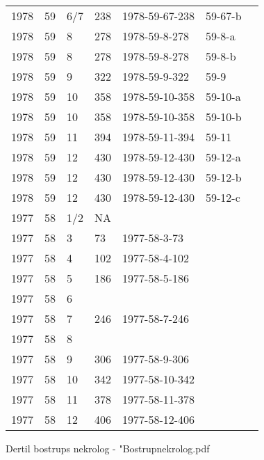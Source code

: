 \begin{longtable}{ |l|l|l|l|p{2.7cm}|l|p{2cm}| }
 1978 & 59 &   6/7 &     238 & 1978-59-67-238 & 59-67-b & \\
 1978 & 59 &     8 &     278 & 1978-59-8-278  & 59-8-a & \\
 1978 & 59 &     8 &     278 & 1978-59-8-278  & 59-8-b & \\
 1978 & 59 &     9 &     322 & 1978-59-9-322  & 59-9  & \\
 1978 & 59 &    10 &     358 & 1978-59-10-358 & 59-10-a & \\
 1978 & 59 &    10 &     358 & 1978-59-10-358 & 59-10-b & \\
 1978 & 59 &    11 &     394 & 1978-59-11-394 & 59-11 & \\
 1978 & 59 &    12 &     430 & 1978-59-12-430 & 59-12-a & \\
 1978 & 59 &    12 &     430 & 1978-59-12-430 & 59-12-b & \\
 1978 & 59 &    12 &     430 & 1978-59-12-430 & 59-12-c & \\
 1977 & 58 &   1/2 &      NA &                &  &  \\
 1977 & 58 &     3 &      73 & 1977-58-3-73   &  & \\
 1977 & 58 &     4 &     102 & 1977-58-4-102  &  & \\
 1977 & 58 &     5 &     186 & 1977-58-5-186  &  & \\
 1977 & 58 &     6 &         &                &  & \\
 1977 & 58 &     7 &     246 & 1977-58-7-246  &  & \\
 1977 & 58 &     8 &         &                &  & \\
 1977 & 58 &     9 &     306 & 1977-58-9-306  &  & \\
 1977 & 58 &    10 & 342     & 1977-58-10-342 &  & \\
 1977 & 58 &    11 &   378   & 1977-58-11-378 &  & \\
 1977 & 58 &    12 &    406  & 1977-58-12-406 &  & \\
\end{longtable}
Dertil bostrups nekrolog - "Bostrupnekrolog.pdf
